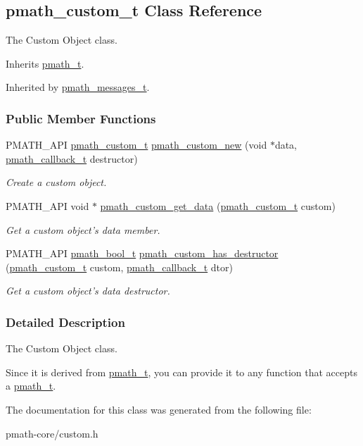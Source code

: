 \hypertarget{classpmath__custom__t}{
\subsection{pmath\_\-custom\_\-t Class Reference}
\label{classpmath__custom__t}
}
The Custom Object class.  


Inherits \hyperlink{classpmath__t}{pmath\_\-t}.

Inherited by \hyperlink{classpmath__messages__t}{pmath\_\-messages\_\-t}.

\subsubsection*{Public Member Functions}
\begin{CompactItemize}
\item 
PMATH\_\-API \hyperlink{classpmath__custom__t}{pmath\_\-custom\_\-t} \hyperlink{group__custom_g2ffdd4054c43b543bed1e5238ab7342c}{pmath\_\-custom\_\-new} (void $\ast$data, \hyperlink{group__general__types_ge1a454657f18f3cc54508adeccccbcbc}{pmath\_\-callback\_\-t} destructor)
\begin{CompactList}\small\item\em Create a custom object. \item\end{CompactList}\item 
PMATH\_\-API void $\ast$ \hyperlink{group__custom_ge7902883fc5e8f88b60410950564fdcd}{pmath\_\-custom\_\-get\_\-data} (\hyperlink{classpmath__custom__t}{pmath\_\-custom\_\-t} custom)
\begin{CompactList}\small\item\em Get a custom object's data member. \item\end{CompactList}\item 
PMATH\_\-API \hyperlink{group__general__types_gc92090cb0b56345d6c379ed2341d4ef4}{pmath\_\-bool\_\-t} \hyperlink{group__custom_g0847bc90fa81ddfdf0f3ff84d32947cf}{pmath\_\-custom\_\-has\_\-destructor} (\hyperlink{classpmath__custom__t}{pmath\_\-custom\_\-t} custom, \hyperlink{group__general__types_ge1a454657f18f3cc54508adeccccbcbc}{pmath\_\-callback\_\-t} dtor)
\begin{CompactList}\small\item\em Get a custom object's data destructor. \item\end{CompactList}\end{CompactItemize}


\subsubsection{Detailed Description}
The Custom Object class. 

Since it is derived from \hyperlink{classpmath__t}{pmath\_\-t}, you can provide it to any function that accepts a \hyperlink{classpmath__t}{pmath\_\-t}. 

The documentation for this class was generated from the following file:\begin{CompactItemize}
\item 
pmath-core/custom.h\end{CompactItemize}
